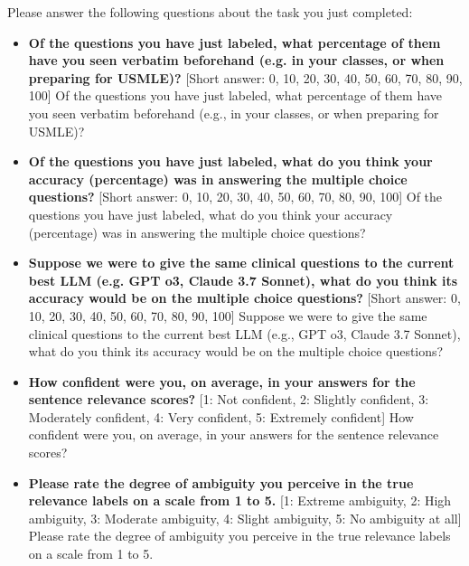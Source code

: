 \documentclass[11pt]{article}
\begin{document}
\begin{tcolorbox}[palebluebox]
\small
Please answer the following questions about the task you just completed:

\vspace{2mm}

\begin{itemize}
    \item \textbf{Of the questions you have just labeled, what percentage of them have you seen verbatim beforehand (e.g. in your classes, or when preparing for USMLE)?} [Short answer: 0, 10, 20, 30, 40, 50, 60, 70, 80, 90, 100] Of the questions you have just labeled, what percentage of them have you seen verbatim beforehand (e.g., in your classes, or when preparing for USMLE)?
    
    \vspace{2mm}
    
    \item \textbf{Of the questions you have just labeled, what do you think your accuracy (percentage) was in answering the multiple choice questions?} [Short answer: 0, 10, 20, 30, 40, 50, 60, 70, 80, 90, 100] Of the questions you have just labeled, what do you think your accuracy (percentage) was in answering the multiple choice questions?
    
    \vspace{2mm}
    
    \item \textbf{Suppose we were to give the same clinical questions to the current best LLM (e.g. GPT o3, Claude 3.7 Sonnet), what do you think its accuracy would be on the multiple choice questions?} [Short answer: 0, 10, 20, 30, 40, 50, 60, 70, 80, 90, 100] Suppose we were to give the same clinical questions to the current best LLM (e.g., GPT o3, Claude 3.7 Sonnet), what do you think its accuracy would be on the multiple choice questions?
    
    \vspace{2mm}
    
    \item \textbf{How confident were you, on average, in your answers for the sentence relevance scores?} [1: Not confident, 2: Slightly confident, 3: Moderately confident, 4: Very confident, 5: Extremely confident] How confident were you, on average, in your answers for the sentence relevance scores?
    
    \vspace{2mm}
    
    \item \textbf{Please rate the degree of ambiguity you perceive in the true relevance labels on a scale from 1 to 5.} [1: Extreme ambiguity, 2: High ambiguity, 3: Moderate ambiguity, 4: Slight ambiguity, 5: No ambiguity at all] Please rate the degree of ambiguity you perceive in the true relevance labels on a scale from 1 to 5.
    

\end{itemize}
\end{tcolorbox}
\end{document}
